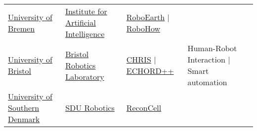 \begin{table}[H]
\begin{tabu} { X[m,c] X[0.9,m,c] X[1.2,m,c] X[1.8,m,c] }
		\tabucline[1pt on 1.5pt off 3pt]{-}
		\href{http://www.uni-bremen.de/en.html}{University of Bremen} &
		\href{http://ai.uni-bremen.de/research}{Institute for Artificial Intelligence} &
		\href{http://roboearth.org/}{RoboEarth} | \href{https://robohow.eu}{RoboHow} &
		\\

		\tabucline[1pt on 1.5pt off 3pt]{-}
		\href{http://www.bristol.ac.uk}{University of Bristol} &
		\href{http://www.brl.ac.uk/}{Bristol Robotics Laboratory} &
		\href{http://www.chrisfp7.eu/}{CHRIS} | \href{http://echord.eu/}{ECHORD++} &
		Human-Robot Interaction | Smart automation \\

		\tabucline[1pt on 1.5pt off 3pt]{-}
		\href{http://www.sdu.dk/en}{University of Southern Denmark} &
		\href{http://www.sdu.dk/en/om_sdu/institutter_centre/sdurobotics}{SDU Robotics} &
		\href{http://www.reconcell.eu/}{ReconCell} &
		\\
	\end{tabu}
	\label{tab:label}
\end{table}



%

